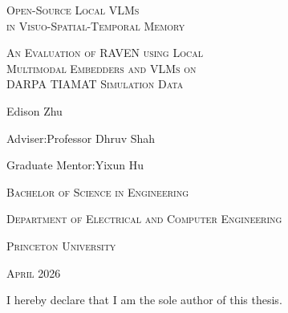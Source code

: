 \documentclass[12pt,letterpaper,oneside]{article}
\title{}
\author{}
\date{}
\begin{document}
\thispagestyle{empty}
\begin{center}
  \vspace*{1.5in}

  {\LARGE\scshape Open-Source Local VLMs\\[8pt]
   in Visuo-Spatial-Temporal Memory\par}

  \vspace{0.6in}

  {\Large\scshape An Evaluation of RAVEN using Local\\[6pt]
   Multimodal Embedders and VLMs on\\[6pt]
   DARPA TIAMAT Simulation Data\par}

  \vspace{1.2in}

  {\large Edison Zhu\par}

  \vspace{0.4in}

  {\normalsize Adviser:\quad Professor Dhruv Shah \par}
  \vspace{4pt}
  {\normalsize Graduate Mentor:\quad Yixun Hu \par}

  \vfill

  {\scshape Bachelor of Science in Engineering\par}
  \vspace{4pt}
  {\scshape Department of Electrical and Computer Engineering\par}
  \vspace{4pt}
  {\scshape Princeton University\par}

  \vspace{0.5in}

  {\scshape April 2026\par}

  \vspace{0.5in}
\end{center}
\newpage

\thispagestyle{empty}
\vspace*{1.0in}
\noindent
I hereby declare that I am the sole author of this thesis.\\[2em]
\end{document}
